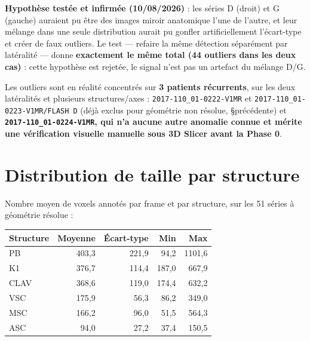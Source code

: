 \textbf{Hypothèse testée et infirmée (10/08/2026)} : les séries D (droit) et G (gauche) auraient pu
être des images miroir anatomique l'une de l'autre, et leur mélange dans une seule distribution
aurait pu gonfler artificiellement l'écart-type et créer de faux outliers. Le test --- refaire la même
détection séparément par latéralité --- donne \textbf{exactement le même total (44 outliers dans les
deux cas)} : cette hypothèse est rejetée, le signal n'est pas un artefact du mélange D/G.

Les outliers sont en réalité concentrés sur \textbf{3 patients récurrents}, sur les deux latéralités
et plusieurs structures/axes : \texttt{2017-110\_01-0222-V1MR} et
\texttt{2017-110\_01-0223-V1MR/FLASH D} (déjà exclus pour géométrie non résolue, \S précédente) et
\textbf{\texttt{2017-110\_01-0224-V1MR}, qui n'a aucune autre anomalie connue et mérite une
vérification visuelle manuelle sous 3D Slicer avant la Phase 0}.


\section{Distribution de taille par structure}
\label{sec:taille-structures}

Nombre moyen de voxels annotés par frame et par structure, sur les 51 séries à géométrie résolue :

\begin{center}
\begin{tabular}{lrrrr}
\toprule
Structure & Moyenne & Écart-type & Min & Max \\
\midrule
PB   & 403,3 & 221,9 & 94,2  & 1101,6 \\
K1   & 376,7 & 114,4 & 187,0 & 667,9 \\
CLAV & 368,6 & 119,0 & 174,4 & 632,2 \\
VSC  & 175,9 & 56,3  & 86,2  & 349,0 \\
MSC  & 166,2 & 96,0  & 51,5  & 564,3 \\
ASC  & 94,0  & 27,2  & 37,4  & 150,5 \\
\bottomrule
\end{tabular}
\end{center}

